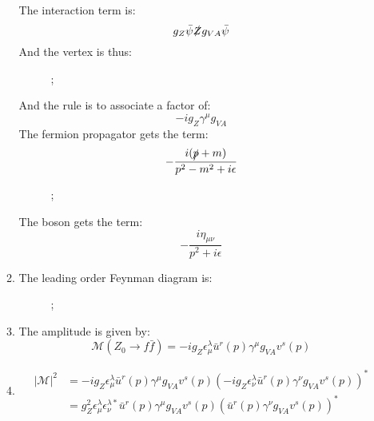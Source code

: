 \documentclass[12pt,a4]{article}
\begin{document}
\begin{enumerate}
\begin{enumerate}
        The interaction term is:
        \begin{equation*}
          g_Z \bar{\psi} \slashed{Z} g_{V A} \bar{\psi}
        \end{equation*}
        And the vertex is thus:
        \begin{figure}[!ht]
          \centering
          ;
        \end{figure}
        And the rule is to associate a factor of:
        \begin{equation*}
          - i g_Z \gamma^\mu g_{V A}
        \end{equation*}
        The fermion propagator gets the term:
        \begin{equation*}
          -\frac{i (\slashed{p} + m)}{p^2 - m^2+ i \epsilon}
        \end{equation*}
        \begin{figure}[!ht]
          \centering
          ;
        \end{figure}
        The boson gets the term:
        \begin{equation*}
          -\frac{i \eta_{\mu\nu}}{p^2 + i \epsilon}
        \end{equation*}
      \item
        The leading order Feynman diagram is:
        \begin{figure}[!ht]
          \centering
          ;
        \end{figure}
      \item
        The amplitude is given by:
        \begin{equation*}
          \mathcal{M}(Z_0 \to f \bar{f}) = - i g_Z \epsilon_\mu^\lambda \bar{u}^r(p) \gamma^\mu g_{V A} v^s(p)
        \end{equation*}
      \item
        \begin{align*}
          |\mathcal{M}|^2 &= - i g_Z \epsilon_\mu^\lambda \bar{u}^r(p) \gamma^\mu g_{V A} v^s(p) (- i g_Z \epsilon_\nu^\lambda \bar{u}^r(p) \gamma^\nu g_{V A} v^s(p))^*\\
                                   &= g_Z^2 \epsilon_\mu^\lambda \epsilon_\nu^{\lambda *} \bar{u}^r(p) \gamma^\mu g_{V A} v^s(p) ( \bar{u}^r(p) \gamma^\nu g_{V A} v^s(p))^*

\end{align*}
\end{enumerate}
\end{enumerate}
\end{document}
